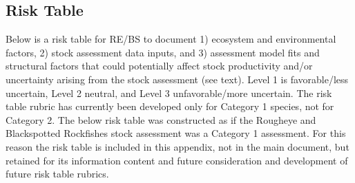 \documentclass[
  english,
]{article}
\begin{document}
\subsection{Risk Table}\label{risk-table-1}

Below is a risk table for RE/BS to document 1) ecosystem and
environmental factors, 2) stock assessment data inputs, and 3)
assessment model fits and structural factors that could potentially
affect stock productivity and/or uncertainty arising from the stock
assessment (see text). Level 1 is favorable/less uncertain, Level 2
neutral, and Level 3 unfavorable/more uncertain. The risk table rubric
has currently been developed only for Category 1 species, not for
Category 2. The below risk table was constructed as if the Rougheye and
Blackspotted Rockfishes stock assessment was a Category 1 assessment.
For this reason the risk table is included in this appendix, not in the
main document, but retained for its information content and future
consideration and development of future risk table rubrics.
\end{document}
